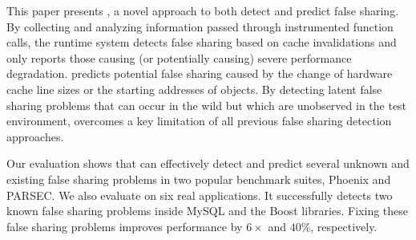 \label{sec:conclusion}
This paper presents \Predator{}, a novel approach to both detect and predict false sharing. 
By collecting and analyzing information passed through instrumented function calls, the runtime system 
detects false sharing based on cache invalidations and only reports those  
causing (or potentially causing) severe performance degradation.
\Predator{} predicts potential false sharing caused by the change of hardware cache line sizes 
or the starting addresses of objects. By detecting latent false
sharing problems that can occur in the wild but which are unobserved
in the test environment, \Predator{} overcomes a key limitation of
all previous false sharing detection approaches.

Our evaluation shows that \Predator{} can effectively detect and predict several 
unknown and existing false sharing problems 
in two popular benchmark suites, Phoenix and PARSEC. 
We also evaluate \Predator{} on six real applications. 
It successfully detects two known false sharing problems inside 
MySQL and the Boost libraries.
Fixing these false sharing problems improves performance by $6\times$ and
$40\%$, respectively.
